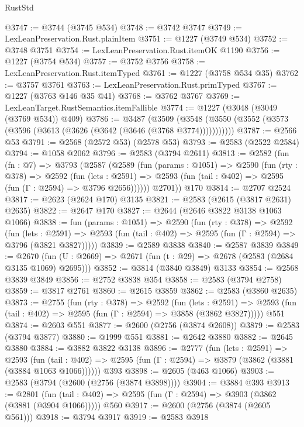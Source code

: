\begin{lexlean}{RustStd}
\begin{coremodule}
@3747 := @3744 (@3745 @534)
@3748 := @3742 @3747
@3749 := LexLeanPreservation.Rust.plainItem
@3751 := @1227 (@3749 @534)
@3752 := @3748 @3751
@3754 := LexLeanPreservation.Rust.itemOK @1190
@3756 := @1227 (@3754 @534)
@3757 := @3752 @3756
@3758 := LexLeanPreservation.Rust.itemTyped
@3761 := @1227 (@3758 @534 @35)
@3762 := @3757 @3761
@3763 := LexLeanPreservation.Rust.primTyped
@3767 := @1227 (@3763 @146 @35 @41)
@3768 := @3762 @3767
@3769 := LexLeanTarget.RustSemantics.itemFallible
@3774 := @1227 (@3048 (@3049 (@3769 @534)) @409)
@3786 := @3487
    (@3509 (@3548 (@3550 (@3552 (@3573 (@3596 (@3613 (@3626 (@3642 (@3646 (@3768 @3774)))))))))))
@3787 := @2566 @53
@3791 := @2568 (@2572 @53) (@2578 @53)
@3793 := @2583 (@2522 @2584)
@3794 := @1058 @2062
@3796 := @2583 (@3794 @2611)
@3813 := @2582
    (fun (fn : @7) =>
    @3793
      (@2587
        (@2589
          (fun (params : @1051) =>
          @2590
            (fun (rty : @378) =>
            @2592
              (fun (lets : @2591) =>
              @2593 (fun (tail : @402) => @2595 (fun (Γ : @2594) => @3796 @2656))))))
        @2701))
    @170
@3814 := @2707 @2524
@3817 := @2623 (@2624 @170) @3135
@3821 := @2583 (@2615 (@3817 @2631) @2635)
@3822 := @2647 @170
@3827 := @2644 (@2646 @3822 @3138 @1063 @1066)
@3838 := fun (params : @1051) =>
  @2590
    (fun (rty : @378) =>
    @2592
      (fun (lets : @2591) =>
      @2593 (fun (tail : @402) => @2595 (fun (Γ : @2594) => @3796 (@3821 @3827)))))
@3839 := @2589 @3838
@3840 := @2587 @3839
@3849 := @2670 (fun (U : @2669) => @2671 (fun (t : @29) => @2678 (@2583 (@2684 @3135 @1069) @2695)))
@3852 := @3814 (@3840 @3849) @3133
@3854 := @2568 @3839 @3849
@3856 := @2752 @3838 @354
@3858 := @2583 (@3794 @2758)
@3859 := @3817 @2761
@3860 := @2615 @3859
@3862 := @2583 (@3860 @2635)
@3873 := @2755
    (fun (rty : @378) =>
    @2592
      (fun (lets : @2591) =>
      @2593 (fun (tail : @402) => @2595 (fun (Γ : @2594) => @3858 (@3862 @3827)))))
    @551
@3874 := @2603 @551
@3877 := @2600 (@2756 (@3874 @2608))
@3879 := @2583 (@3794 @3877)
@3880 := @1999 @551
@3881 := @2642 @3880
@3882 := @2645 @3880
@3884 := @3882 @3822 @3138
@3896 := @2777
    (fun (lets : @2591) =>
    @2593
      (fun (tail : @402) => @2595 (fun (Γ : @2594) => @3879 (@3862 (@3881 (@3884 @1063 @1066))))))
    @393
@3898 := @2605 (@463 @1066)
@3903 := @2583 (@3794 (@2600 (@2756 (@3874 @3898))))
@3904 := @3884 @393
@3913 := @2801
    (fun (tail : @402) => @2595 (fun (Γ : @2594) => @3903 (@3862 (@3881 (@3904 @1066)))))
    @560
@3917 := @2600 (@2756 (@3874 (@2605 @561)))
@3918 := @3794 @3917
@3919 := @2583 @3918

\end{coremodule}
\end{lexlean}

